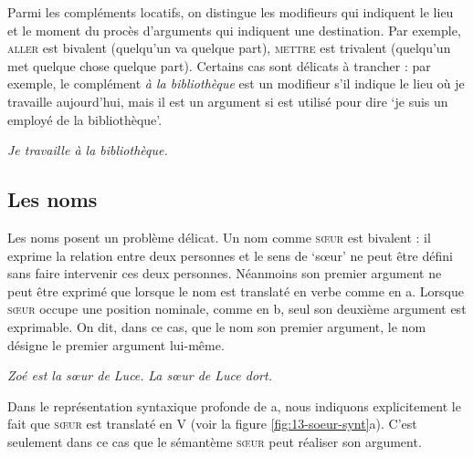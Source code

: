 Parmi les compléments locatifs, on distingue les modifieurs qui indiquent le lieu et le moment du procès d’arguments qui indiquent une destination. Par exemple, \textsc{aller} est bivalent (quelqu’un va quelque part), \textsc{mettre} est trivalent (quelqu’un met quelque chose quelque part). Certains cas sont délicats à trancher : par exemple, le complément \textit{à la bibliothèque} est un modifieur s’il indique le lieu où je travaille aujourd’hui, mais il est un argument si  est utilisé pour dire ‘je suis un employé de la bibliothèque’.

\ea\label{ex:travailler} \textit{Je travaille à la bibliothèque.}\z

\subsection{Les noms} 
Les noms posent un problème délicat. Un nom comme \textsc{sœur} est bivalent : il exprime la relation entre deux personnes et le sens de ‘sœur’ ne peut être défini sans faire intervenir ces deux personnes. Néanmoins son premier argument ne peut être exprimé que lorsque le nom est translaté en verbe comme en a. Lorsque \textsc{sœur} occupe une position nominale, comme en  b, seul son deuxième argument est exprimable. On dit, dans ce cas, que le nom  son premier argument, le nom désigne le premier argument lui-même.

\ea\label{ex:13-soeur}
\ea \textit{Zoé est la sœur de Luce.}
\ex \textit{La sœur de Luce dort.}\z\z

Dans le représentation syntaxique profonde de a, nous indiquons explicitement le fait que \textsc{sœur} est translaté en V (voir la figure \ref{fig:13-soeur-synt}a). C'est seulement dans ce cas que le sémantème \textsc{sœur} peut réaliser son argument.

